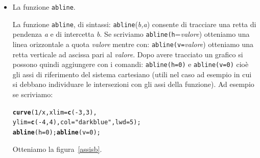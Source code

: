 \documentclass[onecolumn,11pt]{book}\usepackage[]{graphicx}\usepackage[]{color}
\makeatletter
\newcommand{\hlnum}[1]{\textcolor[rgb]{0.686,0.059,0.569}{#1}}%
\newcommand{\hlstr}[1]{\textcolor[rgb]{0.192,0.494,0.8}{#1}}%
\newcommand{\hlopt}[1]{\textcolor[rgb]{0,0,0}{#1}}%
\newcommand{\hlstd}[1]{\textcolor[rgb]{0.345,0.345,0.345}{#1}}%
\newcommand{\hlkwc}[1]{\textcolor[rgb]{0.333,0.667,0.333}{#1}}%
\newcommand{\hlkwd}[1]{\textcolor[rgb]{0.737,0.353,0.396}{\textbf{#1}}}%
\newenvironment{kframe}{%
 \def\at@end@of@kframe{}%
 \ifinner\ifhmode%
  \def\at@end@of@kframe{\end{minipage}}%
  \begin{minipage}{\columnwidth}%
 \fi\fi%
 \def\FrameCommand##1{\hskip\@totalleftmargin \hskip-\fboxsep
 \colorbox{shadecolor}{##1}\hskip-\fboxsep
     \hskip-\linewidth \hskip-\@totalleftmargin \hskip\columnwidth}%
 \MakeFramed {\advance\hsize-\width
   \@totalleftmargin\z@ \linewidth\hsize
   \@setminipage}}%
 {\par\unskip\endMakeFramed%
 \at@end@of@kframe}
\newenvironment{knitrout}{}{} %
\newcommand{\varia}[1]{\textsl{\textsf{#1}}}
\makeatother
\begin{document}
\begin{itemize}
\begin{itemize}
\item{} La funzione  \texttt{abline}.

La funzione \texttt{abline}, di sintassi:
\texttt{abline}(\varia{b,a})
consente di tracciare una retta di pendenza \varia{a} e di intercetta \varia{b}. Se scriviamo \texttt{abline(h}=\varia{valore})
otteniamo una linea orizzontale a quota \varia{valore} mentre con: %
\texttt{abline(v=}\varia{valore}) otteniamo una retta verticale ad ascissa  pari al \varia{valore}. Dopo avere tracciato un grafico si possono quindi aggiungere con i  comandi:%
\texttt{abline(h=0)}
e \texttt{abline(v=0)}
cio\`e gli assi di riferimento del sistema cartesiano (utili nel caso ad esempio in cui si debbano individuare le intersezioni con gli assi della funzione). Ad esempio se scriviamo:


\begin{knitrout}
\color{fgcolor}\begin{kframe}
\begin{alltt}
 \hlkwd{curve}\hlstd{(}\hlnum{1}\hlopt{/}\hlstd{x,}\hlkwc{xlim}\hlstd{=}\hlkwd{c}\hlstd{(} \hlopt{-}\hlnum{3}\hlstd{,}\hlnum{3}\hlstd{),}
 \hlkwc{ylim}\hlstd{=}\hlkwd{c}\hlstd{(}\hlopt{-}\hlnum{4}\hlstd{,}\hlnum{4}\hlstd{),}\hlkwc{col}\hlstd{=}\hlstr{"darkblue"}\hlstd{,}\hlkwc{lwd}\hlstd{=}\hlnum{5}\hlstd{);}
 \hlkwd{abline}\hlstd{(}\hlkwc{h}\hlstd{=}\hlnum{0}\hlstd{);}\hlkwd{abline}\hlstd{(}\hlkwc{v}\hlstd{=}\hlnum{0}\hlstd{);}
\end{alltt}
\end{kframe}
\end{knitrout}

Otteniamo la figura~\ref{assisb}.
\begin{figure}[ htbp]
\begin{center}


\end{center}
\end{figure}
\end{itemize}
\end{itemize}
\end{document}
